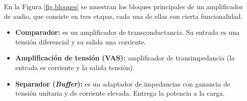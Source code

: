 
	En la Figura \ref{fig.bloques} se muestran los bloques principales de un amplificador de audio, que consiste en tres etapas, cada una de ellas con cierta funcionalidad.

\begin{itemize}
	\item \textbf{Comparador:} es un amplificador de transconductancia. Su entrada es una tensión diferencial y su salida una corriente.
	\item \textbf{Amplificación de tensión (VAS):} amplificador de transimpedancia (la entrada es corriente y la salida tensión).
	\item \textbf{Separador (\textit{Buffer}):} es un adaptador de impedancias con ganancia de tensión unitaria y de corriente elevada. Entrega la potencia a la carga.
\end{itemize}
